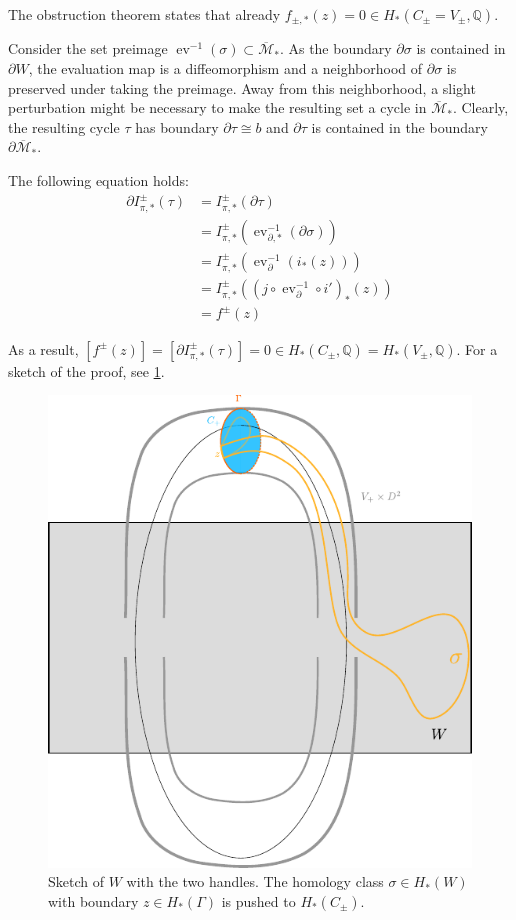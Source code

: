 The obstruction theorem states that already $f_{\pm,*}(z) = 0 \in H_*(C_\pm = V_\pm, \mathbb{Q})$.

Consider the set preimage $\operatorname{ev}^{-1}(\sigma) \subset \overline{\mathcal M}_*$.
As the boundary $\partial \sigma$ is contained in $\partial W$, the evaluation map is a diffeomorphism
and a neighborhood of $\partial \sigma$ is preserved under taking the preimage.
Away from this neighborhood, a slight perturbation might be necessary to make the resulting set a cycle in $\overline{\mathcal M}_*$.
Clearly, the resulting cycle $\tau$ has boundary $\partial \tau \cong b$ and $\partial \tau$ is contained in the boundary $\partial \overline{\mathcal M}_*$.

The following equation holds:
\begin{align*}
    \partial I_{\pi,*}^\pm(\tau) &= I_{\pi,*}^\pm(\partial \tau)\\
    &= I_{\pi, *}^\pm(\operatorname{ev}_{\partial, *}^{-1}(\partial \sigma))\\
    &= I_{\pi, *}^\pm(\operatorname{ev}_\partial^{-1}(i_*(z)))\\
    &= I_{\pi, *}^\pm\left((j \circ \operatorname{ev}_\partial^{-1} \circ i')_*(z)\right)\\
    &= f^\pm(z)
\end{align*}

As a result, $\left[f^\pm(z)\right] = \left[\partial I_{\pi,*}^\pm(\tau)\right] = 0 \in H_*(C_\pm, \mathbb Q) = H_*(V_\pm, \mathbb Q)$.
For a sketch of the proof, see \cref{fig:obstruction_proof_sketch}.

\begin{figure}
    \includegraphics{images/obstruction_proof_sketch.pdf}
    \caption{Sketch of $W$ with the two handles. The homology class $\sigma \in H_*(W)$ with boundary $z \in H_*(\Gamma)$ is pushed to $H_*(C_\pm)$.}
    \label{fig:obstruction_proof_sketch}
\end{figure}